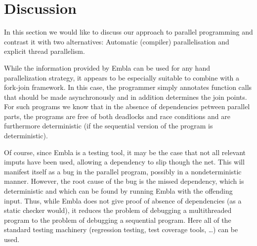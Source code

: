 \section{Discussion}

In this section we would like to discuss our approach to parallel
programming and contrast it with two alternatives: Automatic 
(compiler) parallelisation and explicit thread parallelism.

While the information provided by Embla can be used for any hand 
parallelization strategy, it appears to be especially suitable to
combine with a fork-join framework. In this case, the programmer 
simply annotates function calls that should be made asynchronously 
and in addition determines the join points. For such programs we
know that in the absence of dependencies petween parallel parts,
the programs are free of both deadlocks and race conditions and are 
furthermore deterministic (if the sequential version of the program 
is deterministic).

Of course, since Embla is a testing tool, it may be the case that not
all relevant imputs have been used, allowing a dependency to slip
though the net. This will manifest itself as a bug in the parallel
program, possibly in a nondeterministic manner. However, the root
cause of the bug is the missed dependency, which is deterministic and
which can be found by running Embla with the offending input. Thus,
while Embla does not give proof of absence of dependencies (as a
static checker would), it reduces the problem of debugging a
multithreaded program to the problem of debugging a sequential
program. Here all of the standard testing machinery (regression 
testing, test coverage tools, \ldots) can be used.

